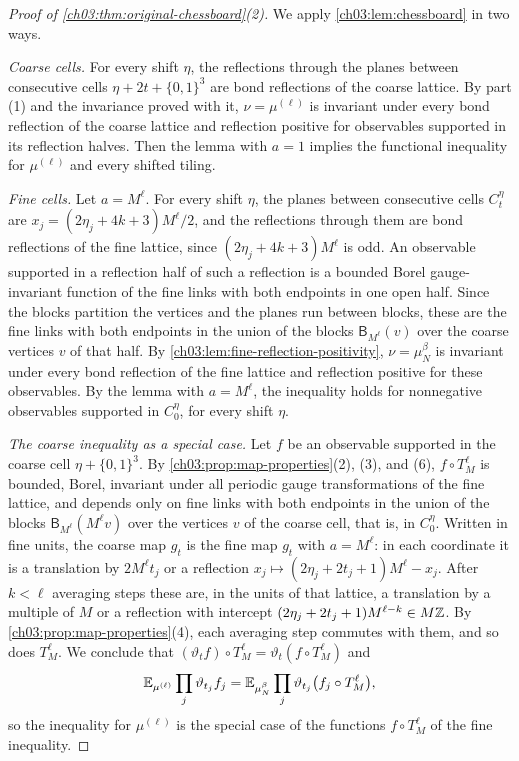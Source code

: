 \begin{proof}[Proof of \cref{ch03:thm:original-chessboard}(2)]
We apply \cref{ch03:lem:chessboard} in two ways.

\emph{Coarse cells.} For every shift $\eta$, the reflections through the planes between consecutive cells $\eta+2t+\{0,1\}^3$ are bond reflections of the coarse lattice. By part (1) and the invariance proved with it, $\nu=\mu^{(\ell)}$ is invariant under every bond reflection of the coarse lattice and reflection positive for observables supported in its reflection halves. Then the lemma with $a=1$ implies the functional inequality for $\mu^{(\ell)}$ and every shifted tiling.

\emph{Fine cells.} Let $a=M^\ell$. For every shift $\eta$, the planes between consecutive cells $C^\eta_t$ are $x_j=(2\eta_j+4k+3)M^\ell/2$, and the reflections through them are bond reflections of the fine lattice, since $(2\eta_j+4k+3)M^\ell$ is odd. An observable supported in a reflection half of such a reflection is a bounded Borel gauge-invariant function of the fine links with both endpoints in one open half. Since the blocks partition the vertices and the planes run between blocks, these are the fine links with both endpoints in the union of the blocks $\mathsf B_{M^\ell}(v)$ over the coarse vertices $v$ of that half. By \cref{ch03:lem:fine-reflection-positivity}, $\nu=\mu_N^\beta$ is invariant under every bond reflection of the fine lattice and reflection positive for these observables. By the lemma with $a=M^\ell$, the inequality holds for nonnegative observables supported in $C^\eta_0$, for every shift $\eta$.

\emph{The coarse inequality as a special case.} Let $f$ be an observable supported in the coarse cell $\eta+\{0,1\}^3$. By \cref{ch03:prop:map-properties}(2), (3), and (6), $f\circ T_M^\ell$ is bounded, Borel, invariant under all periodic gauge transformations of the fine lattice, and depends only on fine links with both endpoints in the union of the blocks $\mathsf B_{M^\ell}(M^\ell v)$ over the vertices $v$ of the coarse cell, that is, in $C^\eta_0$. Written in fine units, the coarse map $g_t$ is the fine map $g_t$ with $a=M^\ell$: in each coordinate it is a translation by $2M^\ell t_j$ or a reflection $x_j\mapsto(2\eta_j+2t_j+1)M^\ell-x_j$. After $k<\ell$ averaging steps these are, in the units of that lattice, a translation by a multiple of $M$ or a reflection with intercept $(2\eta_j+2t_j+1)M^{\ell-k}\in M\mathbb Z$. By \cref{ch03:prop:map-properties}(4), each averaging step commutes with them, and so does $T_M^\ell$. We conclude that $(\vartheta_tf)\circ T_M^\ell=\vartheta_t(f\circ T_M^\ell)$ and
\[
 \mathbb E_{\mu^{(\ell)}}\prod_j\vartheta_{t_j}f_j=\mathbb E_{\mu_N^\beta}\prod_j\vartheta_{t_j}\bigl(f_j\circ T_M^\ell\bigr),
\]
so the inequality for $\mu^{(\ell)}$ is the special case of the functions $f\circ T_M^\ell$ of the fine inequality.


\end{proof}
